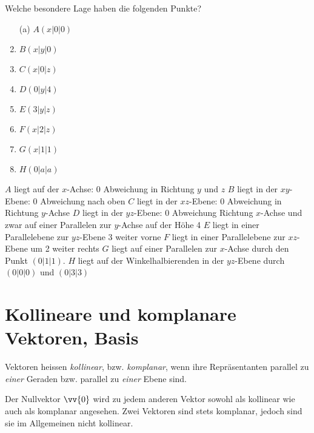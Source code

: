 \begin{exercises}
\begin{exercise}
Welche besondere Lage haben die folgenden Punkte?
\begin{enumerate}
\item[(a)] $A(x|0|0)$
\item $B(x|y|0)$
\item $C(x|0|z)$
\item $D(0|y|4)$
\item $E(3|y|z)$
\item $F(x|2|z)$
\item $G(x|1|1)$
\item $H(0|a|a)$
\end{enumerate}
\begin{answer}
$A$ liegt auf der $x$-Achse: 0 Abweichung in Richtung $y$ und $z$
$B$ liegt in der $xy$-Ebene: 0 Abweichung nach oben
$C$ liegt in der $xz$-Ebene: 0 Abweichung in Richtung $y$-Achse
$D$ liegt in der $yz$-Ebene: 0 Abweichung Richtung $x$-Achse
und zwar auf einer Parallelen zur $y$-Achse auf der Höhe 4
$E$ liegt in einer Parallelebene zur $yz$-Ebene 3 weiter vorne
$F$ liegt in einer Parallelebene zur $xz$-Ebene um 2 weiter rechts
$G$ liegt auf einer Parallelen zur $x$-Achse durch den Punkt $( 0 | 1 | 1 )$.
$H$ liegt auf der Winkelhalbierenden in der $yz$-Ebene durch $( 0 | 0 | 0 )$ und $( 0 | 3 | 3 )$
\end{answer}
\end{exercise}

\end{exercises}

\section{Kollineare und komplanare Vektoren, Basis}
\begin{definition}
Vektoren heissen \textit{kollinear}, bzw. \textit{komplanar}, wenn ihre Repräsentanten parallel zu \textit{einer} Geraden bzw. parallel zu \textit{einer} Ebene sind.
\end{definition}

Der Nullvektor $\vv{0}$ wird zu jedem anderen Vektor sowohl als kollinear wie auch als komplanar angesehen. Zwei Vektoren sind stets komplanar, jedoch sind sie im Allgemeinen nicht kollinear.

